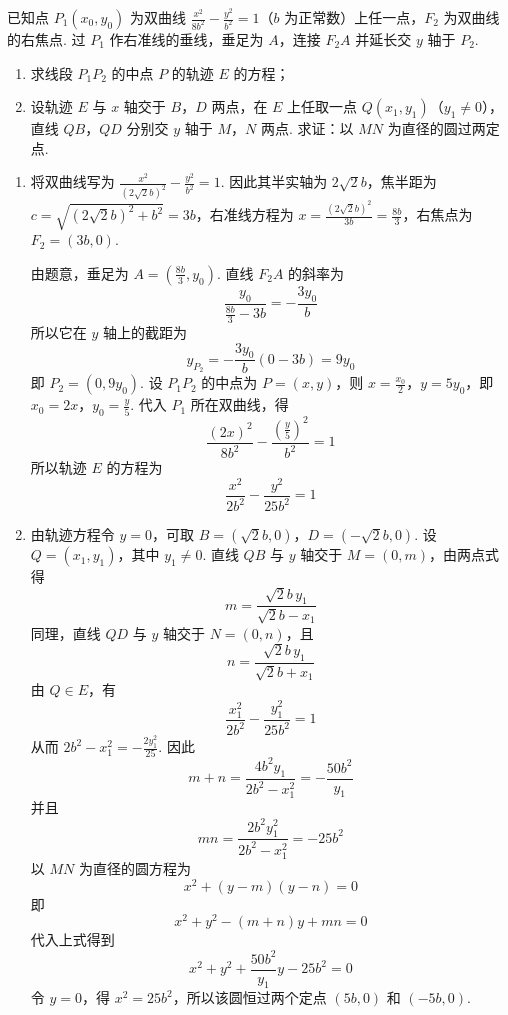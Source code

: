 \begin{problem}
已知点 \(P_{1}(x_{0}, y_{0})\) 为双曲线 \(\frac{x^{2}}{8b^{2}} - \frac{y^{2}}{b^{2}} = 1\)（\(b\) 为正常数）上任一点，\(F_{2}\) 为双曲线的右焦点. 过 \(P_{1}\) 作右准线的垂线，垂足为 \(A\)，连接 \(F_{2}A\) 并延长交 \(y\) 轴于 \(P_{2}\).

\begin{enumerate}
\item 求线段 \(P_{1}P_{2}\) 的中点 \(P\) 的轨迹 \(E\) 的方程；
\item 设轨迹 \(E\) 与 \(x\) 轴交于 \(B\)，\(D\) 两点，在 \(E\) 上任取一点 \(Q(x_{1}, y_{1})\)（\(y_{1} \neq 0\)），直线 \(QB\)，\(QD\) 分别交 \(y\) 轴于 \(M\)，\(N\) 两点. 求证：以 \(MN\) 为直径的圆过两定点.
\end{enumerate}

\end{problem}

\begin{solution}
\begin{enumerate}
\item
将双曲线写为
\(\frac{x^{2}}{(2\sqrt2b)^{2}}-\frac{y^{2}}{b^{2}}=1\). 因此其半实轴为 \(2\sqrt2b\)，焦半距为
\(c=\sqrt{(2\sqrt2b)^{2}+b^{2}}=3b\)，右准线方程为
\(x=\frac{(2\sqrt2b)^{2}}{3b}=\frac{8b}{3}\)，右焦点为 \(F_{2}=(3b,0)\).

由题意，垂足为 \(A=\left(\frac{8b}{3},y_{0}\right)\). 直线 \(F_{2}A\) 的斜率为
\[
\frac{y_{0}}{\frac{8b}{3}-3b}=-\frac{3y_{0}}{b}
\]
所以它在 \(y\) 轴上的截距为
\[
y_{P_{2}}=-\frac{3y_{0}}{b}(0-3b)=9y_{0}
\]
即 \(P_{2}=(0,9y_{0})\). 设 \(P_{1}P_{2}\) 的中点为 \(P=(x,y)\)，则
\(x=\frac{x_{0}}2\)，\(y=5y_{0}\)，即 \(x_{0}=2x\)，\(y_{0}=\frac{y}{5}\). 代入 \(P_{1}\) 所在双曲线，得
\[
\frac{(2x)^{2}}{8b^{2}}-\frac{(\frac{y}{5})^{2}}{b^{2}}=1
\]
所以轨迹 \(E\) 的方程为
\[
\frac{x^{2}}{2b^{2}}-\frac{y^{2}}{25b^{2}}=1
\]

\item
由轨迹方程令 \(y=0\)，可取
\(B=(\sqrt2b,0)\)，\(D=(-\sqrt2b,0)\). 设 \(Q=(x_{1},y_{1})\)，其中 \(y_{1}\neq0\). 直线 \(QB\) 与 \(y\) 轴交于 \(M=(0,m)\)，由两点式得
\[
m=\frac{\sqrt2b\,y_{1}}{\sqrt2b-x_{1}}
\]
同理，直线 \(QD\) 与 \(y\) 轴交于 \(N=(0,n)\)，且
\[
n=\frac{\sqrt2b\,y_{1}}{\sqrt2b+x_{1}}
\]
由 \(Q\in E\)，有
\[
\frac{x_{1}^{2}}{2b^{2}}-\frac{y_{1}^{2}}{25b^{2}}=1
\]
从而 \(2b^{2}-x_{1}^{2}=-\frac{2y_{1}^{2}}{25}\). 因此
\[
m+n=\frac{4b^{2}y_{1}}{2b^{2}-x_{1}^{2}}=-\frac{50b^{2}}{y_{1}}
\]
并且
\[
mn=\frac{2b^{2}y_{1}^{2}}{2b^{2}-x_{1}^{2}}=-25b^{2}
\]
以 \(MN\) 为直径的圆方程为
\[
x^{2}+(y-m)(y-n)=0
\]
即
\[
x^{2}+y^{2}-(m+n)y+mn=0
\]
代入上式得到
\[
x^{2}+y^{2}+\frac{50b^{2}}{y_{1}}y-25b^{2}=0
\]
令 \(y=0\)，得 \(x^{2}=25b^{2}\)，所以该圆恒过两个定点
\((5b,0)\) 和 \((-5b,0)\).
\end{enumerate}
\end{solution}

